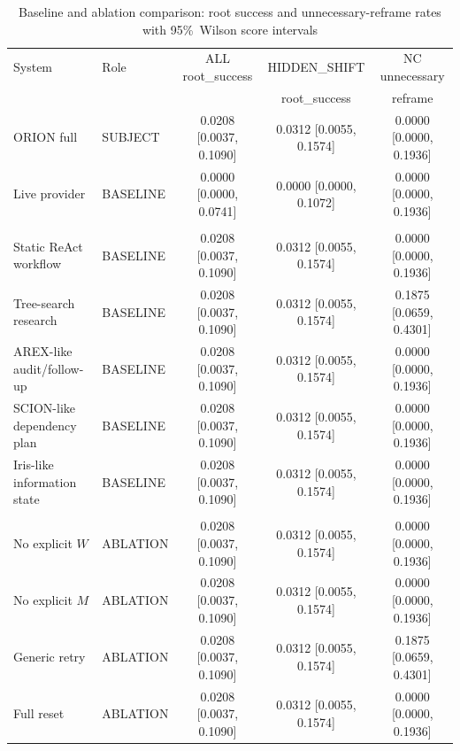 
\begin{table}[t]
  \centering
  \caption{Baseline and ablation comparison: root success and unnecessary-reframe rates with 95\%~Wilson score intervals}
  \label{tab:P1-T2}
  \scriptsize
  \setlength{\tabcolsep}{3pt}
  \begin{tabular}{>{\raggedright\arraybackslash}p{3.05cm}lccc}
    \toprule
    System & Role & ALL root\_success & HIDDEN\_SHIFT & NC unnecessary \\
    & & & root\_success & reframe \\
    \midrule
    ORION full & SUBJECT & 0.0208 [0.0037, 0.1090] & 0.0312 [0.0055, 0.1574] & 0.0000 [0.0000, 0.1936] \\
    Live provider & BASELINE & 0.0000 [0.0000, 0.0741] & 0.0000 [0.0000, 0.1072] & 0.0000 [0.0000, 0.1936] \\
    \addlinespace
    \multicolumn{5}{l}{\textit{Baselines}} \\
    Static ReAct workflow & BASELINE & 0.0208 [0.0037, 0.1090] & 0.0312 [0.0055, 0.1574] & 0.0000 [0.0000, 0.1936] \\
    Tree-search research & BASELINE & 0.0208 [0.0037, 0.1090] & 0.0312 [0.0055, 0.1574] & 0.1875 [0.0659, 0.4301] \\
    AREX-like audit/follow-up & BASELINE & 0.0208 [0.0037, 0.1090] & 0.0312 [0.0055, 0.1574] & 0.0000 [0.0000, 0.1936] \\
    SCION-like dependency plan & BASELINE & 0.0208 [0.0037, 0.1090] & 0.0312 [0.0055, 0.1574] & 0.0000 [0.0000, 0.1936] \\
    Iris-like information state & BASELINE & 0.0208 [0.0037, 0.1090] & 0.0312 [0.0055, 0.1574] & 0.0000 [0.0000, 0.1936] \\
    \addlinespace
    \multicolumn{5}{l}{\textit{Ablations}} \\
    No explicit $W$ & ABLATION & 0.0208 [0.0037, 0.1090] & 0.0312 [0.0055, 0.1574] & 0.0000 [0.0000, 0.1936] \\
    No explicit $M$ & ABLATION & 0.0208 [0.0037, 0.1090] & 0.0312 [0.0055, 0.1574] & 0.0000 [0.0000, 0.1936] \\
    Generic retry & ABLATION & 0.0208 [0.0037, 0.1090] & 0.0312 [0.0055, 0.1574] & 0.1875 [0.0659, 0.4301] \\
    Full reset & ABLATION & 0.0208 [0.0037, 0.1090] & 0.0312 [0.0055, 0.1574] & 0.0000 [0.0000, 0.1936] \\

\end{tabular}
\end{table}
